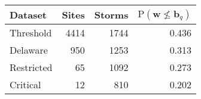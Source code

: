 \begin{tabular}{lrrr}
  \hline
Dataset & Sites & Storms & $\text{P}(\bm{w}\not\leq \bm{b}_{q})$\\ 
  \hline
  Threshold  & \num{4414} & \num{1744} & \num{0.436} \\ 
  Delaware   & \num{950}  & \num{1253} & \num{0.313} \\ 
  Restricted & \num{65}   & \num{1092} & \num{0.273} \\ 
  Critical   & \num{12}   & \num{810}  & \num{0.202} \\ 
  \hline
\end{tabular}
